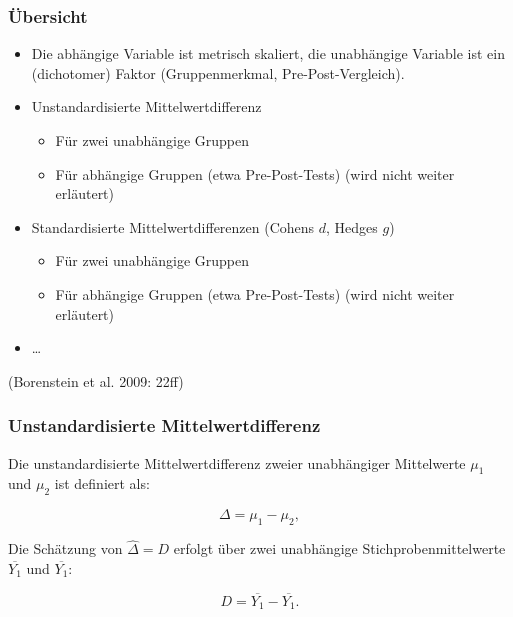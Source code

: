 \begin{frame}
  \frametitle{Übersicht}
  \begin{itemize}[<+->]
  \item Die abhängige Variable ist metrisch skaliert, die unabhängige Variable
    ist ein (dichotomer) Faktor (Gruppenmerkmal, Pre-Post-Vergleich).
  \item Unstandardisierte Mittelwertdifferenz
    \begin{itemize}
    \item Für zwei unabhängige Gruppen
    \item Für abhängige Gruppen (etwa Pre-Post-Tests) (wird nicht weiter erläutert)
    \end{itemize}
  \item Standardisierte Mittelwertdifferenzen (Cohens $d$, Hedges $g$)
    \begin{itemize}
    \item Für zwei unabhängige Gruppen
    \item Für abhängige Gruppen (etwa Pre-Post-Tests) (wird nicht weiter erläutert)
    \end{itemize}
  \item \ldots
  \end{itemize}
  (Borenstein et al. 2009: 22ff)
\end{frame}


\begin{frame}\frametitle{Unstandardisierte Mittelwertdifferenz}

  Die unstandardisierte Mittelwertdifferenz zweier unabhängiger Mittelwerte
  $\mu_1$ und $\mu_2$ ist definiert als:

  \begin{equation}
    \Delta = \mu_1 - \mu_2,
  \end{equation}

  Die Schätzung von $\widehat{\Delta} = D$ erfolgt über zwei unabhängige
  Stichprobenmittelwerte $\overline{Y_1}$ und $\overline{Y_1}$:

  \begin{equation}
    D = \overline{Y_1} - \overline{Y_1}.
  \end{equation}
  
\end{frame}



